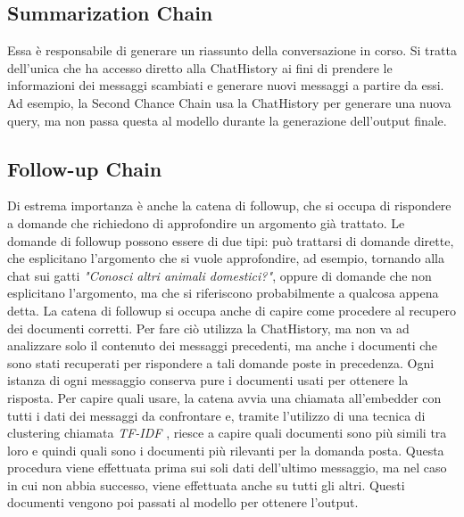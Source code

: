\subsection{Summarization Chain}
Essa è responsabile di generare un riassunto della conversazione in corso. Si tratta dell'unica che ha accesso diretto alla ChatHistory ai fini di prendere le informazioni dei messaggi scambiati e generare nuovi messaggi a partire da essi. Ad esempio, la Second Chance Chain usa la ChatHistory per generare una nuova query, ma non passa questa al modello durante la generazione dell'output finale.

\subsection{Follow-up Chain}
Di estrema importanza è anche la catena di followup, che si occupa di rispondere a domande che richiedono di approfondire un argomento già trattato. Le domande di followup possono essere di due tipi: può trattarsi di domande dirette, che esplicitano l'argomento che si vuole approfondire, ad esempio, tornando alla chat sui gatti \textit{"Conosci altri animali domestici?"}, oppure di domande che non esplicitano l'argomento, ma che si riferiscono probabilmente a qualcosa appena detta.
La catena di followup si occupa anche di capire come procedere al recupero dei documenti corretti. Per fare ciò utilizza la ChatHistory, ma non va ad analizzare solo il contenuto dei messaggi precedenti, ma anche i documenti che sono stati recuperati per rispondere a tali domande poste in precedenza. Ogni istanza di ogni messaggio conserva pure i documenti usati per ottenere la risposta. Per capire quali usare, la catena avvia una chiamata all'embedder con tutti i dati dei messaggi da confrontare e, tramite l'utilizzo di una tecnica di clustering chiamata \textit{TF-IDF} \cite{li2024documenttypeclassificationusing}, riesce a capire quali documenti sono più simili tra loro e quindi quali sono i documenti più rilevanti per la domanda posta. Questa procedura viene effettuata prima sui soli dati dell'ultimo messaggio, ma nel caso in cui non abbia successo, viene effettuata anche su tutti gli altri. Questi documenti vengono poi passati al modello per ottenere l'output.

